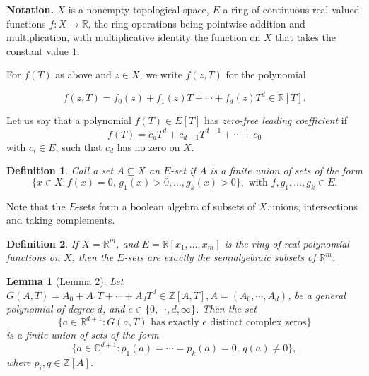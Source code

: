 \documentclass[12pt]{article}
\theoremstyle{mythm}
\newtheorem{lemma}{Lemma}[section]
\newtheorem{definition}{Definition}[section]
\newcommand{\CC}{\mathbb{C}}
\newcommand{\RR}{\mathbb{R}}
\newcommand{\ZZ}{\mathbb{Z}}
\begin{document}
\textbf{Notation.}
$X$ is a nonempty topological space, $E$ a ring of continuous real-valued functions
$f: X \to \mathbb{R}$, the ring operations being pointwise addition and multiplication, with
multiplicative identity the function on $X$ that takes the constant value $1$.

For $f(T)$ as above and $z \in X$, we write $f(z, T)$ for the polynomial

\[
f(z,T) = f_0(z) + f_1(z)T + \cdots + f_d(z)T^d \in \mathbb{R}[T].
\]

Let us say that a polynomial $f(T) \in E[T]$ has \emph{zero-free leading coefficient} if  
\[
f(T) = c_d T^d + c_{d-1} T^{d-1} + \cdots + c_0
\]  
with $c_i \in E$, such that $c_d$ has no zero on $X$.
\begin{definition}
Call a set \( A \subseteq X \) an \( E \)-set if \( A \) is a finite union of sets of the form  
\[\{x \in X : f(x) = 0, \, g_1(x) > 0, \ldots, g_k(x) > 0\}, \text{ with } f, g_1, \ldots, g_k \in E.\]  

\end{definition}
Note that the \( E \)-sets form a boolean algebra of subsets of \( X \).unions, intersections and
 taking complements.

\begin{definition}
    If \( X = \mathbb{R}^m \), and \( E = \mathbb{R}[x_1, \ldots, x_m] \) is the ring of real polynomial functions on \( X \), then the \( E \)-sets are exactly the semialgebraic subsets of \( \mathbb{R}^m \).
\end{definition}

\begin{lemma}[Lemma 2]
Let \( G(A, T) = A_0 + A_1T + \cdots + A_dT^d \in \ZZ[A, T], A = (A_0, \cdots, A_d) \), be a general polynomial of degree \( d \), and \( e \in \{0, \cdots, d, \infty\} \). Then the set
\[
\{a \in \RR^{d+1} : G(a, T) \text{ has exactly } e \text{ distinct complex zeros}\}
\]
is a finite union of sets of the form
\[
\{a \in \CC^{d+1} : p_1(a) = \cdots = p_k(a) = 0, \, q(a) \neq 0\},
\]
where \( p_i, q \in \ZZ[A] \).
\end{lemma}
\end{document}
